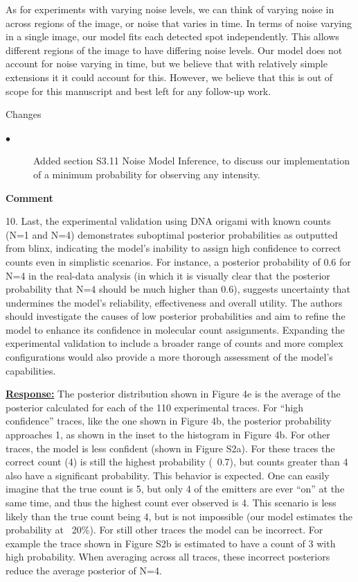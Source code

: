 \documentclass{article}
\begin{document}
As for experiments with varying noise levels, we can think of varying noise in across regions of the image, 
or noise that varies in time. In terms of noise varying in a single image, our model fits each detected spot 
independently. This allows different regions of the image to have differing noise levels.
%
Our model does not account for noise varying in time, but we believe that with relatively simple extensions it 
it could account for this. However, we believe that this is out of scope for this manuscript and best left 
for any follow-up work. 

Changes
\begin{description}
    \item[$\bullet$] Added section S3.11 Noise Model Inference, to discuss our implementation of a minimum probability for 
    observing any intensity. 
\end{description}

\textbf{Comment}

10. Last, the experimental validation using DNA origami with known counts (N=1 and N=4) 
demonstrates suboptimal posterior probabilities as outputted from blinx, 
indicating the model's inability to assign high confidence to correct counts 
even in simplistic scenarios. For instance, a posterior probability of 0.6 for N=4 
in the real-data analysis (in which it is visually clear that the posterior probability 
that N=4 should be much higher than 0.6), suggests uncertainty that undermines the model's 
reliability, effectiveness and overall utility. The authors should investigate the causes 
of low posterior probabilities and aim to refine the model to enhance its confidence in 
molecular count assignments. Expanding the experimental validation to include a broader 
range of counts and more complex configurations would also provide a more thorough assessment 
of the model's capabilities.

\underline{\textbf{Response:}}
The posterior distribution shown in Figure 4e is the average of the posterior 
calculated for each of the 110 experimental traces. 
For “high confidence” traces, like the one shown in Figure 4b, 
the posterior probability approaches 1, as shown in the inset to the histogram in Figure 4b. 
For other traces, the model is less confident (shown in Figure S2a). 
For these traces the correct count (4) is still the highest probability (~0.7), 
but counts greater than 4 also have a significant probability. 
This behavior is expected. 
One can easily imagine that the true count is 5, but only 4 of the emitters are 
ever “on” at the same time, and thus the highest count ever observed is 4. 
This scenario is less likely than the true count being 4, but is not impossible 
(our model estimates the probability at ~20\%). 
For still other traces the model can be incorrect. 
For example the trace shown in Figure S2b is estimated to have a count of 3 with high probability. 
When averaging across all traces, these incorrect posteriors reduce the average posterior of N=4. 
\end{document}
